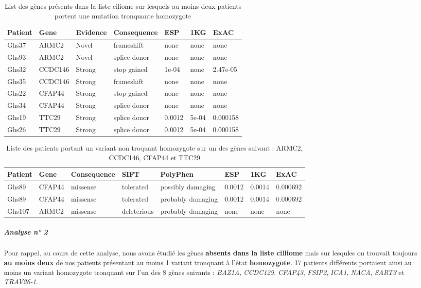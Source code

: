\documentclass[12pt,twoside]{reedthesis}
\theoremstyle{definition}
\theoremstyle{definition}
\theoremstyle{remark}
\begin{document}
  \begin{longtable}[t]{lllllll}
  \caption{\label{tab:tabgrp1high}List des gènes présents dans la liste ciliome sur lesquels au moins deux patients portent une mutation tronquante homozygote}\\
  \toprule
  Patient & Gene & Evidence & Consequence & ESP & 1KG & ExAC\\
  \midrule
  Ghs37 & ARMC2 & Novel & frameshift & none & none & none\\
  Ghs93 & ARMC2 & Novel & splice donor & none & none & none\\
  Ghs32 & CCDC146 & Strong & stop gained & 1e-04 & none & 2.47e-05\\
  Ghs35 & CCDC146 & Strong & frameshift & none & none & none\\
  Ghs22 & CFAP44 & Strong & stop gained & none & none & none\\
  \addlinespace
  Ghs34 & CFAP44 & Strong & splice donor & none & none & none\\
  Ghs19 & TTC29 & Strong & splice donor & 0.0012 & 5e-04 & 0.000158\\
  Ghs26 & TTC29 & Strong & splice donor & 0.0012 & 5e-04 & 0.000158\\
  \bottomrule
  \end{longtable}
  
  \begin{longtable}[t]{llllllll}
  \caption{\label{tab:tabgrp1moderate}Liste des patients portant un variant non troquant homozygote sur un des gènes suivant : ARMC2, CCDC146, CFAP44  et  TTC29}\\
  \toprule
  Patient & Gene & Consequence & SIFT & PolyPhen & ESP & 1KG & ExAC\\
  \midrule
  Ghs89 & CFAP44 & missense & tolerated & possibly damaging & 0.0012 & 0.0014 & 0.000692\\
  Ghs89 & CFAP44 & missense & tolerated & probably damaging & 0.0012 & 0.0014 & 0.000692\\
  Ghs107 & ARMC2 & missense & deleterious & probably damaging & none & none & none\\
  \bottomrule
  \end{longtable}
  
  \newpage
  
  \subparagraph{Analyse n° 2}\label{analyse-n-2}
  
  Pour rappel, au cours de cette analyse, nous avons étudié les gènes
  \textbf{absents dans la liste cilliome} mais sur lesqules on trouvait
  toujours \textbf{au moins deux} de nos patients présentant au moins 1
  variant tronquant à l'état \textbf{homozygote}. 17 patients différents
  portaient ainsi au moins un variant homozygote tronquant sur l'un des 8
  gènes suivants : \emph{BAZ1A}, \emph{CCDC129}, \emph{CFAP43},
  \emph{FSIP2}, \emph{ICA1}, \emph{NACA}, \emph{SART3} et \emph{TRAV26-1}.
  
\end{document}
